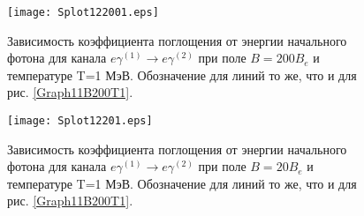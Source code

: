 \begin{figure}[t!]\centering
	\texttt{[image: Splot122001.eps]}
	\caption{Зависимость коэффициента поглощения от энергии начального фотона для канала $e\gamma^{(1)}\to e\gamma^{(2)}$ при поле $B=200 B_e$ и температуре T=1 МэВ. Обозначение для линий то же, что и для рис. \ref{Graph11B200T1}.}
	\label{Graph12B200T1}
\end{figure}

\begin{figure}[t!]\centering
	\texttt{[image: Splot12201.eps]}
	\caption{Зависимость коэффициента поглощения от энергии начального фотона для канала $e\gamma^{(1)}\to e\gamma^{(2)}$ при поле $B=20 B_e$ и температуре T=1 МэВ. Обозначение для линий то же, что и для рис. \ref{Graph11B200T1}.}
	\label{Graph12B20T1}
\end{figure}
\clearpage
